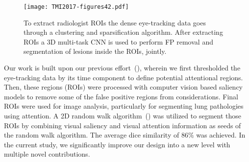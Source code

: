 \documentclass[preprint,12pt]{elsarticle}
\begin{document}
\begin{figure}[h]
\centering
\texttt{[image: TMI2017-figures42.pdf]}
\caption{To extract radiologist ROIs the dense eye-tracking data goes through a clustering and sparsification algorithm. After extracting ROIs a 3D multi-task CNN is used to perform FP removal and segmentation of lesions inside the ROIs, jointly.\label{fig:overview}}
\end{figure}

Our work is built upon our previous effort~(\cite{khosravan2016gaze2segment}), wherein we first thresholded the eye-tracking data by its time component to define potential attentional regions. Then, these regions (ROIs) were processed with computer vision based saliency models to remove some of the false positive regions from considerations. Final ROIs were used for image analysis, particularly for segmenting lung pathologies using attention. A 2D random walk algorithm~(\cite{grady2006random}) was utilized to segment those ROIs by combining visual saliency and visual attention information as seeds of the random walk algorithm. The average dice similarity of $86\%$ was achieved. In the current study, we significantly improve our design into a new level with multiple novel contributions.
\end{document}
